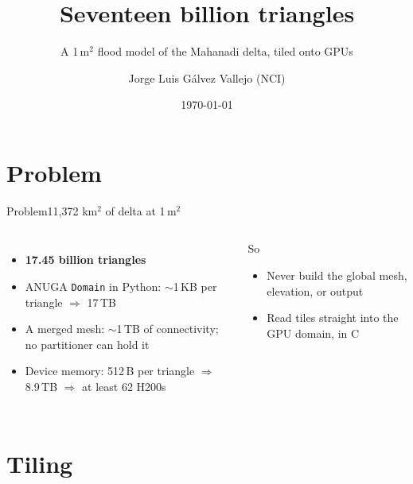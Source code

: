 \documentclass[aspectratio=169]{beamer}
\title[1 m$^2$ ANUGA]{Seventeen billion triangles}
\subtitle{A 1\,m$^2$ flood model of the Mahanadi delta, tiled onto GPUs}
\author[NCI]{Jorge Luis G\'alvez Vallejo \textnormal{(NCI)}}
\institute{NCI}
\date{\today}
\begin{document}
\maketitle

\section{Problem}

\begin{frame}{Problem}{11,372 km$^2$ of delta at 1\,m$^2$}
  \begin{columns}[T,onlytextwidth]
      \begin{itemize}\setlength\itemsep{5pt}
        \item \textbf{17.45 billion triangles}
        \item ANUGA \texttt{Domain} in Python: $\sim$1\,KB per triangle $\Rightarrow$ 17\,TB
        \item A merged mesh: $\sim$1\,TB of connectivity; no partitioner can hold it
        \item Device memory: 512\,B per triangle $\Rightarrow$ 8.9\,TB $\Rightarrow$ at least 62 H200s
      \end{itemize}
      \begin{block}{So}
        \begin{itemize}
          \item Never build the global mesh, elevation, or output
          \item Read tiles straight into the GPU domain, in C
        \end{itemize}
      \end{block}
  \end{columns}
\end{frame}

\section{Tiling}
\end{document}
